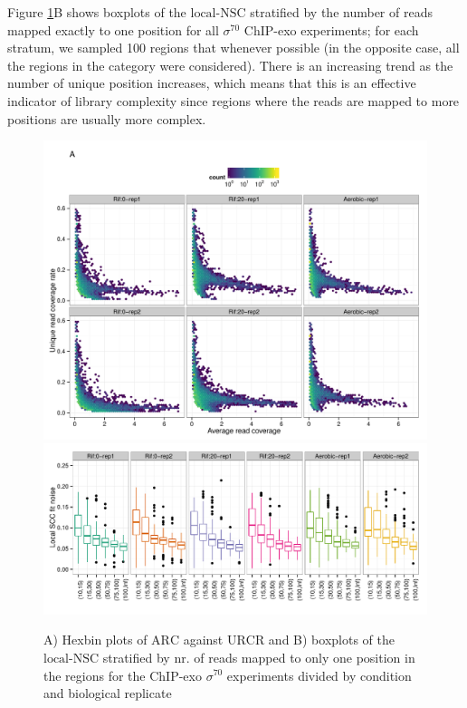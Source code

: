 \documentclass{bmcart}\usepackage[]{graphicx}\usepackage[]{color}
\begin{document}
Figure \ref{fig:enrich}B shows boxplots of the $\mbox{local-NSC}$
stratified by the number of reads mapped exactly to one position for
all $\sigma^{70}$ ChIP-exo experiments; for each stratum, we sampled
100 regions that whenever possible (in the opposite case,
all the regions in the category were considered). There is an
increasing trend as the number of unique position increases, which
means that this is an effective indicator of library complexity since
regions where the reads are mapped to more positions are usually more
complex.


\begin{figure}[h!]
  \centering
  \includegraphics[width = .8\textwidth]{../figs/for_paper/Sig70_enrichment.pdf}
  \includegraphics[width = .8\textwidth,page =3]{../figs/for_paper/Local_SCC_indicator_by_strata.pdf}
  \caption{A) Hexbin plots of $\mbox{ARC}$ against $\mbox{URCR}$ and
    B) boxplots of the $\mbox{local-NSC}$ stratified by nr. of reads
    mapped to only one position in the regions for the ChIP-exo
    $\sigma^{70}$ experiments divided by condition and biological
    replicate}
  \label{fig:enrich}
\end{figure}
\end{document}
